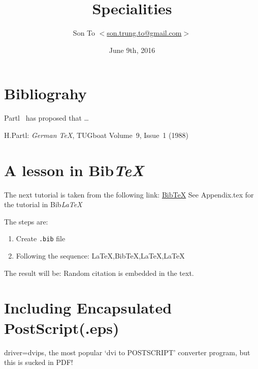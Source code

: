 \documentclass[a4paper,11pt]{article}
\author{Son To $<$\href{mailto:son.trung.to@gmail.com}%
{son.trung.to@gmail.com}$>$}
\date{June 9th, 2016}
\title{Specialities}
\begin{document}
  \maketitle
  \tableofcontents
  \newpage
  \section{Bibliograhy}
Partl~\cite{pa} has
proposed that \ldots
  \begin{thebibliography}{99}
    H.Partl:
    \emph{German \TeX},
    TUGboat Volume~9, Issue~1 (1988)
  \end{thebibliography}

\section{A lesson in Bib\emph{TeX}}
The next tutorial is taken from the
following link:
\bigbreak
\href{https://www.latex-tutorial.com/tutorials/beginners/latex-bibtex/}%
{BibTeX}
\flushleft
See Appendix.tex for the tutorial in Bib\emph{LaTeX}

The steps are:
\flushleft
\begin{enumerate}
  \item Create \verb+.bib+ file
  \item Following the sequence: La\TeX,Bib\TeX,La\TeX,La\TeX
\end{enumerate}
The result will be:
Random citation \cite{DUMMY:1} is embedded in the text.
\newpage



\section{Including Encapsulated PostScript(.eps)}
driver=dvips, the most popular `dvi to POSTSCRIPT'
converter program, but this is sucked in PDF!
\end{document}
